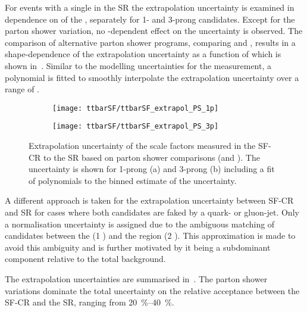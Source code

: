 For \ttbar events with a single \faketauhadvis in the \hadhad SR the
extrapolation uncertainty is examined in dependence on \pT of the
\faketauhadvis, separately for 1- and 3-prong candidates. Except for
the parton shower variation, no \pT-dependent effect on the
uncertainty is observed.  The comparison of alternative parton shower
programs, comparing \PYTHIA[8] and \HERWIG[7], results in a
shape-dependence of the extrapolation uncertainty as a function of
\tauhadvis \pT which is shown in~.
Similar to the modelling uncertainties for the measurement, a
polynomial is fitted to smoothly interpolate the extrapolation
uncertainty over a range of \tauhadvis \pT. 

\begin{figure}[htbp]
  \centering

  \begin{subfigure}[t]{.495\textwidth}
    \texttt{[image: ttbarSF/ttbarSF\_extrapol\_PS\_1p]}
    \caption{}
    \label{fig:ttbarSF_extrapol_shape_a}
  \end{subfigure}\hfill%
  \begin{subfigure}[t]{.495\textwidth}
    \texttt{[image: ttbarSF/ttbarSF\_extrapol\_PS\_3p]}
    \caption{}
    \label{fig:ttbarSF_extrapol_shape_b}
  \end{subfigure}

  \caption{Extrapolation uncertainty of the scale factors measured in
    the SF-CR to the \hadhad SR based on parton shower comparisons
    (\PYTHIA[8] and \HERWIG[7]). The uncertainty is shown for 1-prong
    (a) and 3-prong \faketauhadvis (b) including a fit of polynomials
    to the binned estimate of the uncertainty. }
  \label{fig:ttbarSF_extrapol_shape}
\end{figure}

A different approach is taken for the extrapolation uncertainty
between SF-CR and \hadhad SR for cases where both \tauhadvis
candidates are faked by a quark- or gluon-jet. Only a normalisation
uncertainty is assigned due to the ambiguous matching of \tauhadvis
candidates between the \lephad (1 \faketauhadvis) and the \hadhad
region (2 \faketauhadvis). This approximation is made to avoid this
ambiguity and is further motivated by it being a subdominant component
relative to the total \ttbarFakes background.

The extrapolation uncertainties are summarised
in~. The parton shower
variations dominate the total uncertainty on the relative acceptance
between the SF-CR and the SR, ranging from \SIrange{20}{40}{\percent}.

